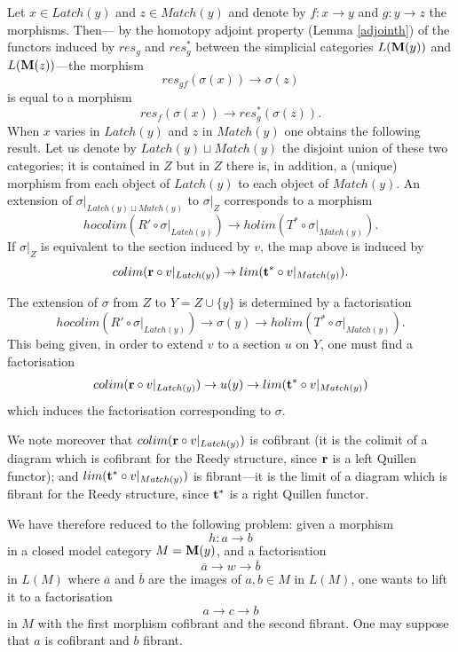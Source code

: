 Let $x\in Latch(y)$ and $z\in Match(y)$
and denote by $f: x\rightarrow y$ and $g: y\rightarrow z$ the morphisms.
Then---
by the homotopy adjoint property (Lemma \ref{adjointh}) of the functors
induced by $res_g$ and $res_g^{\ast}$ between the simplicial categories $L({\bf M}
(y))$ and $L({\bf M} (z))$---the morphism
$$
res_{gf}(\sigma (x))\rightarrow \sigma (z)
$$
is equal to a morphism
$$
res_f(\sigma (x)) \rightarrow res_g^{\ast} (\sigma (z)).
$$
When $x$ varies in $Latch (y)$ and $z$ in $Match (y)$ one obtains the
following result.
Let us denote by $Latch(y)\sqcup Match(y)$ the disjoint union of these two
categories; it
is contained in $Z$ but in $Z$ there is, in addition, a (unique)
morphism from each object of $Latch(y)$ to each object of $Match(y)$.
An extension of $\sigma |_{Latch(y)\sqcup Match(y)}$ to $\sigma |_Z$
corresponds to a morphism
$$
hocolim (R'\circ \sigma |_{Latch(y)})\rightarrow
holim (T^{\ast} \circ \sigma |_{Match(y)}).
$$
If $\sigma |_Z$ is equivalent to the section induced by $v$, the map
above is induced by
$$
colim ({\bf r}\circ v|_{Latch (y)})\rightarrow
lim ({\bf t}^{\ast} \circ v|_{Match(y)}).
$$

The extension of $\sigma$ from $Z$ to $Y=Z\cup \{ y\}$ is determined
by a factorisation
$$
hocolim (R'\circ \sigma |_{Latch(y)})\rightarrow \sigma (y) \rightarrow
holim (T^{\ast} \circ \sigma |_{Match(y)}).
$$
This being given, in order to extend $v$ to a section $u$ on $Y$, one must
find a factorisation
$$
colim ({\bf r}\circ v|_{Latch (y)})\rightarrow u(y)\rightarrow
lim ({\bf t}^{\ast} \circ v|_{Match(y)})
$$
which induces the factorisation corresponding to $\sigma$.

We note moreover that $colim ({\bf r}\circ v|_{Latch (y)})$
is cofibrant (it is the colimit of a diagram which is cofibrant for the
Reedy structure, since ${\bf r}$ is a left Quillen functor);
and $lim ({\bf t}^{\ast} \circ v|_{Match(y)})$ is fibrant---it is the limit
of a diagram which is fibrant for the Reedy structure, since ${\bf t}^{\ast}$
is a right Quillen functor.

We have therefore reduced to the following problem: given a morphism
$$
h:a\rightarrow b
$$
in a closed model category $M={\bf M} (y)$, and a factorisation
$$
\overline{a} \rightarrow w \rightarrow \overline{b}
$$
in $L(M)$ where $\overline{a}$ and $\overline{b}$ are the images of $a,b\in M$
in $L(M)$, one wants to lift it to a factorisation
$$
a\rightarrow c \rightarrow b
$$
in $M$ with the first morphism cofibrant and the second
fibrant. One may suppose that $a$ is cofibrant and $b$ fibrant.

